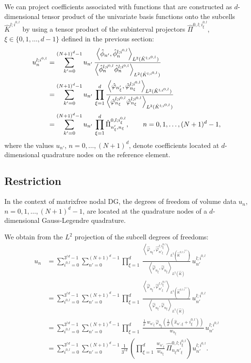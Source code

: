 \documentclass{scrreprt}
\theoremstyle{definition}
\theoremstyle{nonumberplain}
\newcommand{\cell}{K}
\newcommand{\refCell}{\hat{\cell}}
\begin{document}
We can project coefficients associated with functions that
are constructed as $d$-dimensional tensor product
of the univariate basis functions onto the subcells
$\refCell^{l;i^{0,l}}$ by using a tensor product of the subinterval projectors
$\hat{\Pi}^{0,l;i^{0;l}_\xi}$, $\xi\in\{0,1,\ldots,d-1\}$
defined in the previous section:
\begin{align}
u^{l;i^{0,l}}_n
&=
\sum_{k'=0}^{(N+1)^{d}-1} u_{n'}\,
\frac{
\left\langle
\hat{\phi}_{n'},
\hat{\phi}^{l;i^{0,l}}
_{n}
\right\rangle
_{L^2(\refCell^{l;i^{0,l}})}
}
{
\left\langle
\hat{\phi}^{l;i^{0,l}}_{n}
\hat{\phi}^{l;i^{0,l}}_{n}
\right\rangle
_{L^2(\refCell^{l;i^{0,l}})}
}
\notag
\\
&=
\sum_{k'=0}^{(N+1)^{d}-1} u_{n'}\,
\prod_{\xi=1}^{d}
\frac{
\left\langle
\hat{\varphi}_{n'_\xi},
\hat{\varphi}^{l;i^{0,l}}_{n_\xi}
\right\rangle
_{L^2(\refCell^{l;i^{0,l}})}
}
{
\left\langle
\hat{\varphi}^{l;i^{0,l}}_{n_\xi}
\hat{\varphi}^{l;i^{0,l}}_{n_\xi}
\right\rangle
_{L^2(\refCell^{l;i^{0,l}})}
}
\notag
\\
&= \sum_{k'=0}^{(N+1)^{d}-1} u_{n'}\,\prod_{\xi=1}^{d}
\hat{\Pi}^{0,l;i^{0,l}_\xi}_{n'_\xi,n_\xi},\qquad n =
0,1,\ldots,(N+1)^{d}-1,
\end{align}
where the values $u_{n'}$, $n=0,\ldots,(N+1)^d$, denote coefficients
located at $d$-dimensional quadrature nodes on the reference element.  

\subsection{Restriction}
In the context of matrixfree nodal DG, the degrees of freedom of 
volume data $u_n$, $n=0,1,\ldots,(N+1)^d-1$, are located at the quadrature
nodes of a $d$-dimensional Gauss-Legendre quadrature.

We obtain from the $L^2$ projection of the 
subcell degrees of freedoms:
\begin{align}
u_n
&=
\sum_{i^{0,l}=0}^{3^{l\,d}-1}
\sum_{n'=0}^{(N+1)^{d}-1}
\prod_{\xi=1}^{d}\,
\frac{
\left\langle
\hat{\varphi}_{n_{\xi}},
\hat{\varphi}_{n'_{\xi}}^{l;i^{0;l}_\xi}
\right\rangle
_{L^2(\refCell^{0,l;i^{0;l}})}
}
{
\left\langle
\hat{\varphi}_{n_{\xi}},
\hat{\varphi}_{n_{\xi}}
\right\rangle
_{L^2(\refCell)}
}
\,u^{l;i^{0,l}}_{n'}
\\
&=
\sum_{i^{0,l}=0}^{3^{l\,d}-1}
\sum_{n'=0}^{(N+1)^{d}-1}
\prod_{\xi=1}^{d}\,
\frac{
\left\langle
\hat{\varphi}_{n_\xi},
\hat{\varphi}_{n'_\xi}^{l;i^{0;l}_\xi}
\right\rangle
_{L^2(\refCell^{0,l;i^{0;l}})}
}
{
\left\langle
\hat{\varphi}_{n_\xi},
\hat{\varphi}_{n_\xi}
\right\rangle
_{L^2(\refCell)}
}
\,
u^{l;i^{0,l}}_{n'}
\\
&=
\sum_{i^{0,l}=0}^{3^{l\,d}-1}
\sum_{n'=0}^{(N+1)^{d}-1}
\prod_{\xi=1}^{d}\,
\frac{
\frac{1}{3^{l}}\,
w_{n'_\xi}\,
\hat{\varphi}_{n_\xi}
\left(
\frac{1}{3^{l}} (\hat{x}_{n',\xi}+i_\xi^{0,l})
\right)
}
{
w_{n_\xi}
}
\,
u^{l;i^{0,l}}_{n'}
\\
&=
\sum_{i^{0,l}=0}^{3^{l\,d}-1}
\sum_{n'=0}^{(N+1)^{d}-1}
\frac{1}{3^{l\,d}}\,
\left(
\prod_{\xi=1}^{d}\,
\frac{w_{n'_\xi}}{w_{n_\xi}}\,
\hat{\Pi}^{0,l;i^{0,l}_\xi}_{n_\xi n'_\xi}
\right)
u^{l;i^{0,l}}_{n'}.
\end{align}
\end{document}
